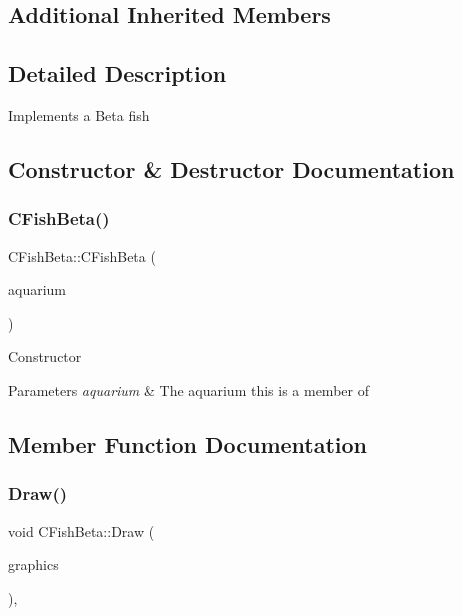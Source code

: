 \subsection*{Additional Inherited Members}


\subsection{Detailed Description}
Implements a Beta fish 

\subsection{Constructor \& Destructor Documentation}
\mbox{\label{class_c_fish_beta_a021073e2e0034271cd7e776b1e3fed29}} 
\subsubsection{\texorpdfstring{CFishBeta()}{CFishBeta()}}
{\footnotesize\ttfamily C\+Fish\+Beta\+::\+C\+Fish\+Beta (\begin{DoxyParamCaption}\item[{\mbox{\hyperlink{class_c_aquarium}{C\+Aquarium}} $\ast$}]{aquarium }\end{DoxyParamCaption})}

Constructor 
\begin{DoxyParams}{Parameters}
{\em aquarium} & The aquarium this is a member of \\
\hline
\end{DoxyParams}


\subsection{Member Function Documentation}
\mbox{\label{class_c_fish_beta_a52e78e404e78d8b676c6b3a5916043eb}} 
\subsubsection{\texorpdfstring{Draw()}{Draw()}}
{\footnotesize\ttfamily void C\+Fish\+Beta\+::\+Draw (\begin{DoxyParamCaption}\item[{Gdiplus\+::\+Graphics $\ast$}]{graphics }\end{DoxyParamCaption})\hspace{0.3cm}{\ttfamily [override]}, {\ttfamily [virtual]}}

